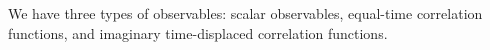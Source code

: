 

We have three types of observables: scalar observables, equal-time correlation functions, and imaginary time-displaced correlation functions.



